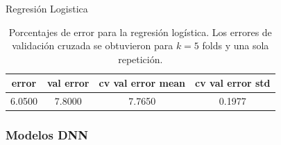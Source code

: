 \documentclass[notheorems]{beamer}
\begin{document}
\begin{frame}{Regresión Logistica}
    
    \begin{table}[H]
        \centering
        \begin{tabular}{c|c|c|c}
            \toprule
            error & val error & cv val error mean & cv val error std \\
            \midrule
            6.0500 &  7.8000 & 7.7650 & 0.1977  \\
            \bottomrule
        \end{tabular}
        \caption{Porcentajes de error para la regresión logística. Los errores de validación cruzada se obtuvieron para $k=5$ folds y una sola repetición.}
        \label{tab:logreg}
    \end{table}
\end{frame}
\begin{frame}
    \frametitle{Modelos DNN}
    \begin{table}[H]
        \centering
        \caption{Descripción de los seis modelos DNN. La columna Dropout indica el valor del dropout después de la capa densa. Input Dropout es la fracción de dropout entre la entrada de datos y la primera capa densa. La columna Regularization indica la regularización sobre las aristas posteriores a cada capa densa.}
        \label{tab:DNNdes}
    \end{table}
\end{frame}
\end{document}

